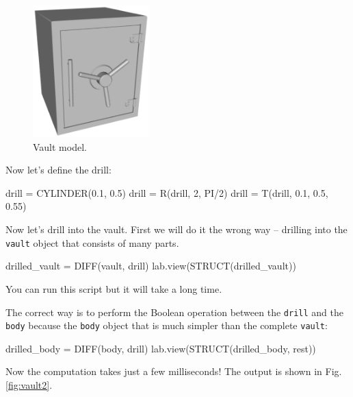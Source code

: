 \begin{figure}[!ht]
\begin{center}
\includegraphics[width=0.4\textwidth]{img/vault.png}
\end{center}
\vspace{-4mm}
\caption{Vault model.}
\label{fig:vault}
\end{figure}
\noindent
Now let's define the drill: 
\begin{bluecode}
drill = CYLINDER(0.1, 0.5)
drill = R(drill, 2, PI/2)
drill = T(drill, 0.1, 0.5, 0.55)
\end{bluecode}
\index{}Now let's drill into the vault. First we will do it 
the wrong way -- drilling into the {\tt vault} object
that consists of many parts. 

\begin{bluecode}
drilled_vault = DIFF(vault, drill)
lab.view(STRUCT(drilled_vault))
\end{bluecode}
You can run this script but it will take a long time.

The correct way is to perform the Boolean 
operation between the {\tt drill} and the {\tt body} 
because the {\tt body} object that is much simpler 
than the complete {\tt vault}: 

\begin{bluecode}
drilled_body = DIFF(body, drill)
lab.view(STRUCT(drilled_body, rest))
\end{bluecode}
Now the computation takes just a few milliseconds!
The output is shown in Fig.\ref{fig:vault2}.
\newpage

